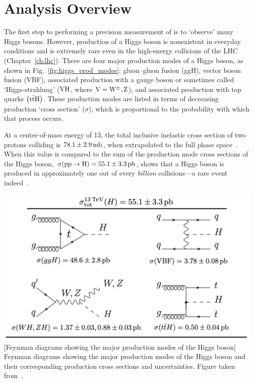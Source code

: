 \section{Analysis Overview}
\label{sec:analysis_overview}
The first step to performing a precision measurement of \mH is to `observe' many Higgs bosons.
However, production of a Higgs boson is nonexistent in everyday conditions and is extremely rare even in the high-energy \pp collisions of the LHC (Chapter~\ref{ch:lhc}).
There are four major production modes of a Higgs boson, as shown in Fig.~\ref{fig:higgs_prod_modes}:
gluon--gluon fusion (ggH),
vector boson fusion (VBF),
associated production with a gauge boson or sometimes called `Higgs-strahlung' ($\mathrm{V} \mathrm{H}$, where $\mathrm{V} = \mathrm{W}^\pm, \text{Z}$),
and associated production with top quarks $\left( \mathrm{t} \bar{\mathrm{t}} \mathrm{H} \right)$.
These production modes are listed in terms of decreasing production `cross section' ($\sigma$), which is proportional to the probability with which that process occurs.

At a center-of-mass energy of 13\TeV, the total inclusive inelastic cross section of two protons colliding is $78.1 \pm 2.9\,\text{mb}$, when extrapolated to the full phase space~\cite{ATLAS:2016ygv}.
When this value is compared to the sum of the production mode cross sections of the Higgs boson, $\sigma(\mathrm{p} \mathrm{p} \to \mathrm{H}) = 55.1 \pm 3.3\,\text{pb}$, shows that a Higgs boson is produced in approximately one out of every \emph{billion} \pp collisions---a rare event indeed~\cite{new_pdg_2022}.
\begin{multiFigure}
	\centering
		\includegraphics[width=\textwidth]{figures/higgsmassmeas/higgs_prod_modes.png}
		[Feynman diagrams showing the major production modes of the Higgs boson]
		{Feynman diagrams showing the major production modes of the Higgs boson and their corresponding production cross sections and uncertainties.
		Figure taken from~\cite{new_pdg_2022}.}
	\label{fig:higgs_prod_modes}
\end{multiFigure} 

